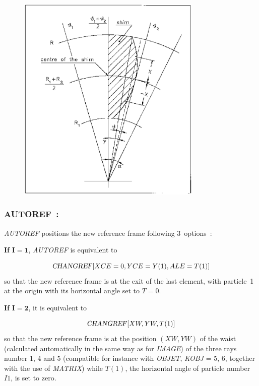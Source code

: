 \vfill 

\begin{figure}[H]
\centerline{\includegraphics[height=10cm]{Fig13.ps}}
{\setlength{\captionwidth}{10cm}
   }
\end{figure}




\newpage

\subsubsection*{AUTOREF~: \AUTOREFTitl}\label{AUTOREF} 
\medskip

\textsl{AUTOREF} positions the new reference frame following 3~options~:
\bigskip

\noindent\textbf{If} $\mathbf{I = 1}$, \textsl{AUTOREF} is equivalent to 

$$ \text{\textsl{CHANGREF}} \lbrack XCE=0, YCE=Y(1), ALE=T(1)\rbrack $$
%
 so that the new reference frame is at the exit of the last element,
with particle~1 at the origin with its horizontal angle set to $ T=0$.   

\bigskip

\noindent\textbf{If} $\mathbf{I=2}$, it is equivalent to

$$ \text{\textsl{CHANGREF}} \lbrack XW, YW, T(1)\rbrack $$
%
 so that the new reference frame is at the position $ (XW, YW) $ of
the waist (calculated automatically in the same way as for 
\textsl{IMAGE}) of the three rays number 1, 4 and 5 (compatible for instance
with \textsl{OBJET}, \textsl{KOBJ}  =  5, 6,  together with the 
use of \textsl{MATRIX}) while $T(1)$, the horizontal angle of particle number $I1$,  is set to zero.  


